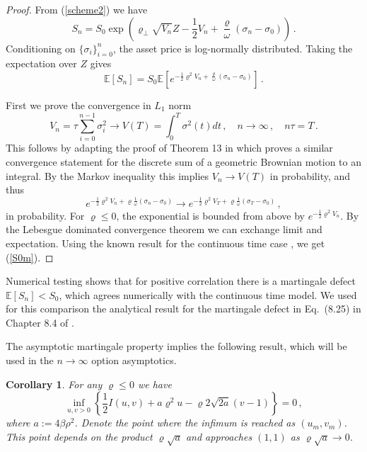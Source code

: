 \documentclass[11pt]{article}
\numberwithin{equation}{section}
\theoremstyle{plain}
\newtheorem{corollary}[theorem]{Corollary}
\begin{document}
\begin{proof}
From (\ref{scheme2}) we have
\begin{equation}\label{sum2}
S_n = S_0\exp\left(  \varrho_\perp \sqrt{V_n}
Z - \frac{1}{2} V_n +  \frac{\varrho}{\omega } 
(\sigma_{n} - \sigma_{0})\right)\,.
\end{equation}
Conditioning on $\{\sigma_i\}_{i=0}^n$, the asset price is log-normally 
distributed. Taking the expectation over $Z$ gives
\begin{equation}
\mathbb{E}[S_n] = 
S_0 \mathbb{E}\left[e^{-\frac12 \varrho^2 V_n + \frac{\varrho}{\omega}
(\sigma_n - \sigma_0)}\right]\,.
\end{equation}

First we prove the convergence in $L_1$ norm
\begin{equation}
V_n = \tau \sum_{i=0}^{n-1} \sigma_i^2 \to V(T) = \int_0^T \sigma^2(t) dt \,,
\quad n \to \infty\,, \quad n\tau = T\,.
\end{equation}
This follows by adapting the proof of Theorem 13 in \cite{IME} which proves 
a similar convergence statement for the discrete sum of a geometric Brownian 
motion to an integral.
By the Markov inequality this implies $V_n \to V(T)$ in probability, and
thus 
\begin{equation}
e^{-\frac12 \varrho^2 V_n + \varrho \frac{1}{\omega}(\sigma_n-\sigma_0)}
\to e^{-\frac12 \varrho^2 V_T + \varrho \frac{1}{\omega}(\sigma_T-\sigma_0)}\,,
\end{equation}
in probability.
For $\varrho\leq 0$, the exponential is bounded from above by 
$e^{-\frac12 \varrho^2 V_n}$.
By the Lebesgue dominated convergence theorem we can exchange limit and 
expectation. Using the known result for the continuous time case 
\cite{BCM,Jourdain,LM}, we get (\ref{S0m}).
\end{proof}

Numerical testing shows that for positive correlation there is a martingale 
defect $\mathbb{E}[S_n] < S_0$, which agrees numerically with the continuous 
time model. We used for this comparison the analytical result for the 
martingale defect in Eq.~(8.25) in Chapter 8.4 of \cite{Lewis2017}. %

The asymptotic martingale property implies the following result, which will be used in the
$n\to \infty$ option asymptotics.

\begin{corollary}\label{lemma:2}
For any $\varrho \leq 0$ we have 
\begin{equation}\label{infmartingale}
\inf_{u,v>0} \left\{ \frac12 I(u,v) + a \varrho^2 u - \varrho 2\sqrt{2a} (v-1)
\right\} = 0 \,,
\end{equation}
where $a:=4\beta\rho^{2}$.
Denote the point where the infimum is reached as $(u_m,v_m)$. This
point depends on the product $\varrho\sqrt{a}$ and approaches $(1,1)$ 
as $\varrho\sqrt{a} \to 0$.
\end{corollary}
\end{document}
